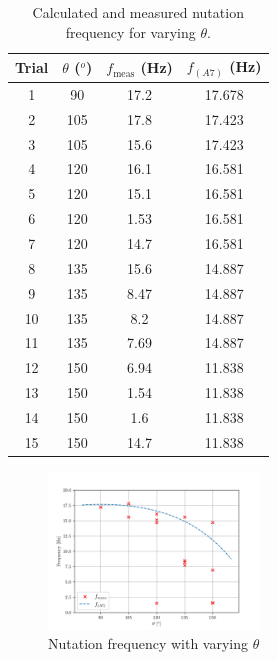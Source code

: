 \documentclass[8pt]{article}
\begin{document}
\begin{table}[H]
    \centering
    \begin{tabular}{|c|c|c|c|}
        \hline
        Trial & $\theta$ ($^o$) & $f_{\text{meas}}$ (Hz) & $f_{(A7)}$ (Hz) \\
        \hline
        1	& 90   &	17.2    & 	17.678 \\
        2	& 105  &	17.8    & 	17.423 \\
        3	& 105  &	15.6    & 	17.423 \\
        4	& 120  &	16.1    & 	16.581 \\
        5	& 120  &	15.1    & 	16.581 \\
        6	& 120  &	1.53    & 	16.581 \\
        7	& 120  &	14.7    & 	16.581 \\
        8	& 135  &	15.6    & 	14.887 \\
        9	& 135  &	8.47    & 	14.887 \\
        10	& 135  &	8.2	    &   14.887 \\
        11	& 135  &	7.69    & 	14.887 \\
        12	& 150  &	6.94    & 	11.838 \\
        13	& 150  &	1.54    & 	11.838 \\
        14	& 150  &	1.6	    &   11.838 \\
        15	& 150  &	14.7    & 	11.838 \\
        \hline
    \end{tabular}
    \caption{Calculated and measured nutation frequency for varying $\theta$.}
    \label{tab:nutation}
\end{table}

\begin{figure}[H]
    \centering
    \includegraphics[width=0.5\textwidth]{nutation.png}
    \caption{Nutation frequency with varying $\theta$}
    \label{fig:nutation}
\end{figure}

\end{document}
